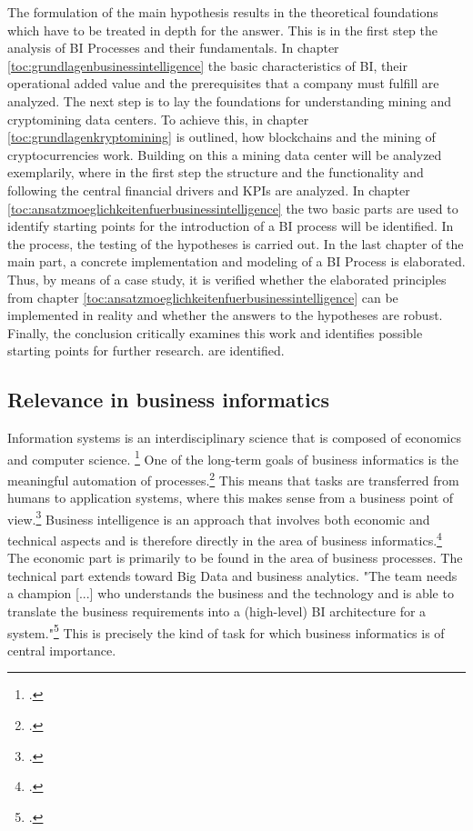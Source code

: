 The formulation of the main hypothesis results in the theoretical foundations which have to be treated in depth for the answer.
This is in the first step the analysis of \ac{BI} Processes and their fundamentals. In chapter \ref{toc:grundlagenbusinessintelligence}
the basic characteristics of \ac{BI}, their operational added value and the prerequisites that a company must fulfill are analyzed.
The next step is to lay the foundations for understanding mining and cryptomining data centers. To achieve this,
in chapter \ref{toc:grundlagenkryptomining} is outlined, how blockchains and the mining of cryptocurrencies work. Building on this
a mining data center will be analyzed exemplarily, where in the first step the structure and the functionality and following the central
financial drivers and \acp{KPI} are analyzed. In chapter \ref{toc:ansatzmoeglichkeitenfuerbusinessintelligence} the two
basic parts are used to identify starting points for the introduction of a \ac{BI} process will be identified. In the process, the testing of the
hypotheses is carried out. In the last chapter of the main part, a concrete implementation and modeling of a \ac{BI} Process
is elaborated. Thus, by means of a case study, it is verified whether the elaborated principles from chapter
\ref{toc:ansatzmoeglichkeitenfuerbusinessintelligence} can be implemented in reality and whether the answers to the hypotheses are robust.
Finally, the conclusion critically examines this work and identifies possible starting points for further research.
are identified.

\subsection{Relevance in business informatics} \label{toc:relevanzinderwirtschaftinformatik}

Information systems is an interdisciplinary science that is composed of economics and computer science.
\footcite[Cf.][p. 5]{mertens2005grundzuge} One of the long-term goals of business informatics is the meaningful
automation of processes.\footcite[Cf.][p. 4]{mertens2005grundzuge} This means that tasks are transferred from humans to application systems,
where this makes sense from a business point of view.\footcite[Cf.][p. 4]{mertens2005grundzuge}
Business intelligence is an approach that involves both economic and technical aspects and is therefore directly
in the area of business informatics.\footcite[Cf.][p. 102]{azma2012business} The economic part is primarily to be found in the area of business processes.
The technical part extends toward Big Data and business analytics. "The
team needs a champion [...] who understands the business and the technology and is able to translate the business requirements into a
(high-level) \ac{BI} architecture for a system."\footcite[][p. 27]{yeoh2010critical} This is precisely the kind of task for which business informatics
is of central importance.

